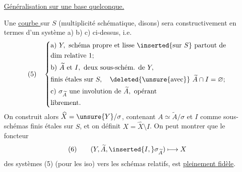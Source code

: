 \uline{Généralisation sur une base quelconque.}

Une \uline{courbe } sur $S$ (multiplicité schématique, disons) sera  constructivement en termes d'un système a) b) c)  ci-dessus, i.e.
\[
(5)\quad\left\{\begin{aligned}
&\text{a) }Y,\text{ schéma propre et lisse }\inserted{\text{sur }S}\text{ partout de}\\
&\text{dim relative }1;\\
&\text{b) }\widetilde A\text{ et }I,\text{ deux sous-schém. de }Y,\\
&\text{finis étales sur }S,\quad\deleted{\unsure{\text{avec}}}\ \widetilde A\cap I=\varnothing;\\
&\text{c) }\sigma_{\widetilde A}\text{ une involution de }\widetilde A,\text{ opérant}\\
&\text{librement.}
\end{aligned}\right.
\]
On construit alors $\widehat X=\unsure{Y}/\sigma$, contenant $A\simeq\widetilde A/\sigma$ et $I$ comme sous-schémas  finis étales sur $S$, et on définit $X=\widehat X\setminus I$. On peut montrer que le foncteur
\[
(6)\qquad(Y,\widetilde A,\inserted{I,}\sigma_{\widetilde A})\longmapsto X
\]
des systèmes (5) (pour les iso) vers les schémas relatifs,  est \uline{pleinement fidèle}.
